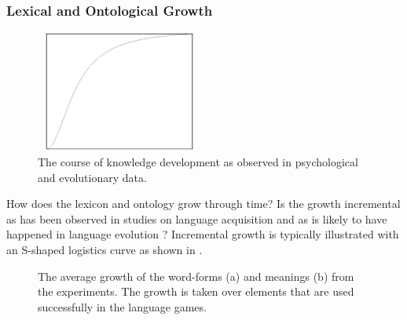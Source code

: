 \subsubsection{Lexical and Ontological Growth}

\begin{figure}
\centerline{\includegraphics[width=5.5cm,height=4cm]{basic/growth.eps}}
\caption{The course of knowledge development as observed in psychological and evolutionary data.}
\label{f:st:growth}
\end{figure}

How does the lexicon and ontology grow through time? Is the growth incremental as has been observed in studies on language acquisition and as is likely to have happened in language evolution \citep{aitchison:1996}? Incremental growth is typically illustrated with an S-shaped logistics curve as shown in .

\begin{figure}
\centering
{}
\caption{The average growth of the word-forms (a) and meanings (b) from the experiments. The growth is taken over elements that are used successfully in the language games.}
\label{f:st:growthlex}
\end{figure}

